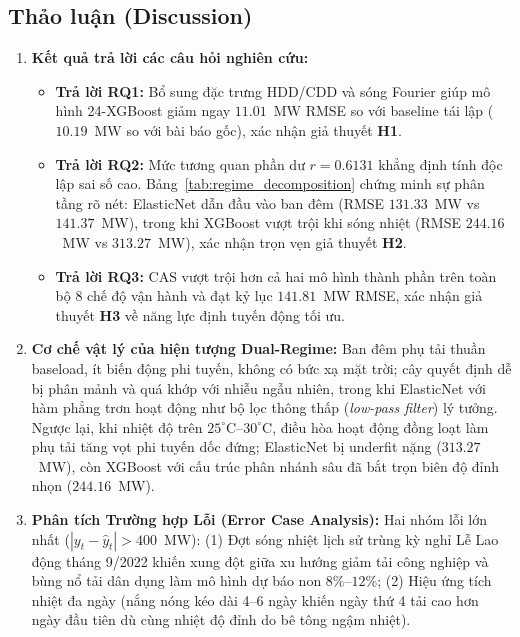 \subsection{Thảo luận (Discussion)}
\begin{enumerate}
    \item \textbf{Kết quả trả lời các câu hỏi nghiên cứu:}
    \begin{itemize}
        \item \textbf{Trả lời RQ1:} Bổ sung đặc trưng HDD/CDD và sóng Fourier giúp mô hình 24-XGBoost giảm ngay $11.01$~MW RMSE so với baseline tái lập ($10.19$~MW so với bài báo gốc), xác nhận giả thuyết \textbf{H1}.
        \item \textbf{Trả lời RQ2:} Mức tương quan phần dư $r = 0.6131$ khẳng định tính độc lập sai số cao. Bảng~\ref{tab:regime_decomposition} chứng minh sự phân tầng rõ nét: ElasticNet dẫn đầu vào ban đêm (RMSE $131.33$~MW vs $141.37$~MW), trong khi XGBoost vượt trội khi sóng nhiệt (RMSE $244.16$~MW vs $313.27$~MW), xác nhận trọn vẹn giả thuyết \textbf{H2}.
        \item \textbf{Trả lời RQ3:} CAS vượt trội hơn cả hai mô hình thành phần trên toàn bộ 8 chế độ vận hành và đạt kỷ lục $141.81$~MW RMSE, xác nhận giả thuyết \textbf{H3} về năng lực định tuyến động tối ưu.
    \end{itemize}
    \item \textbf{Cơ chế vật lý của hiện tượng Dual-Regime:}
    Ban đêm phụ tải thuần baseload, ít biến động phi tuyến, không có bức xạ mặt trời; cây quyết định dễ bị phân mảnh và quá khớp với nhiễu ngẫu nhiên, trong khi ElasticNet với hàm phẳng trơn hoạt động như bộ lọc thông thấp (\textit{low-pass filter}) lý tưởng. Ngược lại, khi nhiệt độ trên $25^\circ\text{C}$--$30^\circ\text{C}$, điều hòa hoạt động đồng loạt làm phụ tải tăng vọt phi tuyến dốc đứng; ElasticNet bị underfit nặng ($313.27$~MW), còn XGBoost với cấu trúc phân nhánh sâu đã bắt trọn biên độ đỉnh nhọn ($244.16$~MW).
    \item \textbf{Phân tích Trường hợp Lỗi (Error Case Analysis):}
    Hai nhóm lỗi lớn nhất ($|y_t - \hat{y}_t| > 400$~MW): (1) Đợt sóng nhiệt lịch sử trùng kỳ nghỉ Lễ Lao động tháng 9/2022 khiến xung đột giữa xu hướng giảm tải công nghiệp và bùng nổ tải dân dụng làm mô hình dự báo non $8\%$--$12\%$; (2) Hiệu ứng tích nhiệt đa ngày (nắng nóng kéo dài 4--6 ngày khiến ngày thứ 4 tải cao hơn ngày đầu tiên dù cùng nhiệt độ đỉnh do bê tông ngậm nhiệt).
\end{enumerate}

